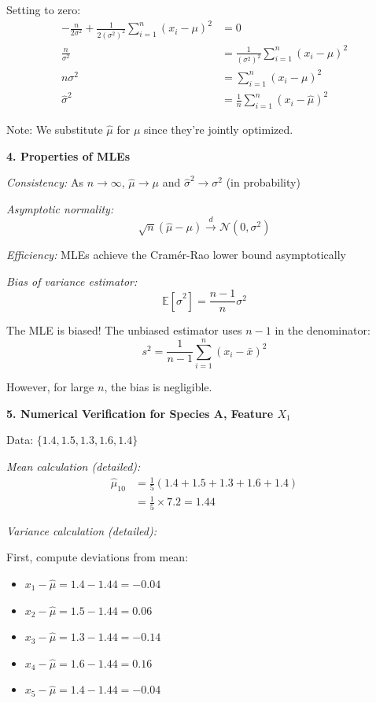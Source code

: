 \documentclass[12pt]{article}
\begin{document}
\begin{explanation}
Setting to zero:
\begin{align}
-\frac{n}{2\sigma^2} + \frac{1}{2(\sigma^2)^2}\sum_{i=1}^{n}(x_i - \mu)^2 &= 0 \\
\frac{n}{\sigma^2} &= \frac{1}{(\sigma^2)^2}\sum_{i=1}^{n}(x_i - \mu)^2 \\
n\sigma^2 &= \sum_{i=1}^{n}(x_i - \mu)^2 \\
\hat{\sigma}^2 &= \frac{1}{n}\sum_{i=1}^{n}(x_i - \hat{\mu})^2
\end{align}

Note: We substitute $\hat{\mu}$ for $\mu$ since they're jointly optimized.

\textbf{4. Properties of MLEs}

\textit{Consistency:} As $n \to \infty$, $\hat{\mu} \to \mu$ and $\hat{\sigma}^2 \to \sigma^2$ (in probability)

\textit{Asymptotic normality:}
\[
\sqrt{n}(\hat{\mu} - \mu) \xrightarrow{d} \mathcal{N}(0, \sigma^2)
\]

\textit{Efficiency:} MLEs achieve the Cramér-Rao lower bound asymptotically

\textit{Bias of variance estimator:}
\[
\mathbb{E}[\hat{\sigma}^2] = \frac{n-1}{n}\sigma^2
\]

The MLE is biased! The unbiased estimator uses $n-1$ in the denominator:
\[
s^2 = \frac{1}{n-1}\sum_{i=1}^{n}(x_i - \bar{x})^2
\]

However, for large $n$, the bias is negligible.

\textbf{5. Numerical Verification for Species A, Feature $X_1$}

Data: $\{1.4, 1.5, 1.3, 1.6, 1.4\}$

\textit{Mean calculation (detailed):}
\begin{align}
\hat{\mu}_{10} &= \frac{1}{5}(1.4 + 1.5 + 1.3 + 1.6 + 1.4) \\
&= \frac{1}{5} \times 7.2 = 1.44
\end{align}

\textit{Variance calculation (detailed):}

First, compute deviations from mean:
\begin{itemize}
    \item $x_1 - \hat{\mu} = 1.4 - 1.44 = -0.04$
    \item $x_2 - \hat{\mu} = 1.5 - 1.44 = 0.06$
    \item $x_3 - \hat{\mu} = 1.3 - 1.44 = -0.14$
    \item $x_4 - \hat{\mu} = 1.6 - 1.44 = 0.16$
    \item $x_5 - \hat{\mu} = 1.4 - 1.44 = -0.04$
\end{itemize}


\end{explanation}
\end{document}
